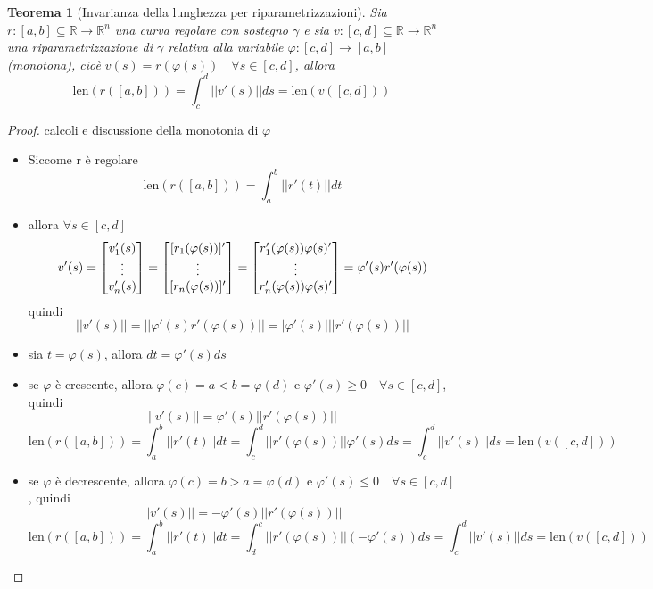 \documentclass[12pt, a4paper]{article}
\theoremstyle{break}
\newtheorem{theorem}{Teorema} %
\begin{document}
\newpage
\begin{theorem} [Invarianza della lunghezza per riparametrizzazioni]
	Sia $r: [a,b] \subseteq \mathbb{R} \to \mathbb{R}^n$ una curva
	regolare con sostegno $\gamma$ e sia $v: [c,d] \subseteq \mathbb{R}
		\to \mathbb{R}^n$ una riparametrizzazione di $\gamma$ relativa
	alla variabile $ \varphi : [c,d] \to [a,b]$ (monotona), cioè
	$v(s) = r(\varphi (s)) \quad \forall s \in [c,d]$, allora
	\[
		\text{len}(r([a,b])) = \int_{c}^{d} || v'(s) || ds =
		\text{len}(v([c,d])) \]
\end{theorem}
\begin{proof} calcoli e discussione della monotonia di $\varphi$
	\begin{itemize}
		\item Siccome r è regolare
			\[
				\text{len}(r([a,b])) = \int_{a}^{b} || r'(t) || dt
			\]
		\item allora $\forall s \in [c,d]$
			\[
				v'(s) =
				\begin{bmatrix}
					v_1'(s) \\
					\vdots  \\
					v_n'(s) \\
				\end{bmatrix}
				=
				\begin{bmatrix}
					[r_1(\varphi(s))]' \\
					\vdots             \\
					[r_n(\varphi(s))]' \\
				\end{bmatrix}
				=
				\begin{bmatrix}
					r_1'(\varphi(s))\varphi(s)' \\
					\vdots                      \\
					r_n'(\varphi(s))\varphi(s)' \\
				\end{bmatrix}
				= \varphi'(s) r'(\varphi(s))\\
			\]
			quindi
			\[
				||v'(s)|| = ||\varphi'(s) r'(\varphi(s))|| = |\varphi'(s)| ||
				r'(\varphi(s))||
			\]
		\item sia $t = \varphi(s)$, allora $ dt = \varphi'(s) ds$
		\item se $\varphi$ è crescente, allora $\varphi(c) = a < b =
				\varphi(d)$ e $\varphi'(s) \geq 0 \quad \forall s \in [c,d]$,
			quindi
			\[
				||v'(s)|| = \varphi'(s) || r'(\varphi(s))||
			\]
			\[
				\text{len}(r([a,b])) =
				\int_{a}^{b} || r'(t) || dt =
				\int_{c}^{d} || r'(\varphi(s))|| \varphi'(s) ds =
				\int_{c}^{d} || v'(s) || ds =
				\text{len}(v([c,d]))
			\]
		\item se $\varphi$ è decrescente, allora $\varphi(c) = b > a =
				\varphi(d)$ e $\varphi'(s) \leq 0 \quad \forall s \in [c,d]$,
			quindi
			\[
				||v'(s)|| = -\varphi'(s) || r'(\varphi(s))||
			\]
			\[
				\text{len}(r([a,b])) =
				\int_{a}^{b} || r'(t) || dt =
				\int_{d}^{c} || r'(\varphi(s))|| (-\varphi'(s)) ds =
				\int_{c}^{d} || v'(s) || ds =
				\text{len}(v([c,d]))
			\]
	\end{itemize}
\end{proof}
\end{document}
